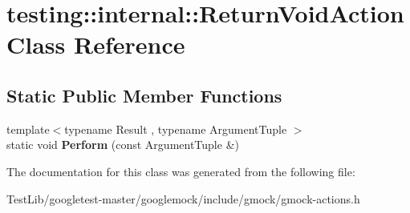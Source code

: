 \hypertarget{classtesting_1_1internal_1_1ReturnVoidAction}{}\section{testing\+:\+:internal\+:\+:Return\+Void\+Action Class Reference}
\label{classtesting_1_1internal_1_1ReturnVoidAction}
\subsection*{Static Public Member Functions}
\begin{DoxyCompactItemize}
\item 
\mbox{\label{classtesting_1_1internal_1_1ReturnVoidAction_ab9ea50ff501225b7510a623d0f0a405e}} 
{\footnotesize template$<$typename Result , typename Argument\+Tuple $>$ }\\static void {\bfseries Perform} (const Argument\+Tuple \&)
\end{DoxyCompactItemize}


The documentation for this class was generated from the following file\+:\begin{DoxyCompactItemize}
\item 
Test\+Lib/googletest-\/master/googlemock/include/gmock/gmock-\/actions.\+h\end{DoxyCompactItemize}
